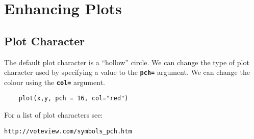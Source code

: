 \documentclass[a4paper,12pt]{article}
\begin{document}
\tableofcontents
\newpage
\section{Enhancing Plots}

\subsection{Plot Character}
The default plot character is a “hollow” circle. We can change the type of plot character used by specifying a value to the \textbf{\texttt{pch=}} argument. We can  change the colour using the \textbf{\texttt{col=}} argument.
\begin{framed}
	\begin{verbatim}
	plot(x,y, pch = 16, col="red")
	\end{verbatim}
\end{framed}

For a list of plot characters see: \begin{verbatim}
http://voteview.com/symbols_pch.htm
\end{verbatim}
\newpagea
\end{document}
